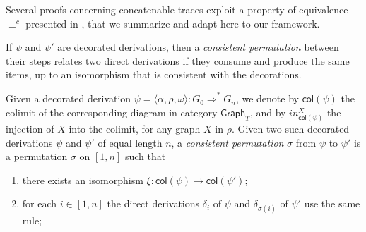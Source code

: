 \documentclass[conference]{IEEEtran}
\newcommand{\full}[1]{}
\newcommand{\full}[1]{{#1}}
\newcommand{\Rrel}[1]   {\stackrel{{#1}}{\Longrightarrow}}
\newcommand{\interval}[2][1]{\ensuremath{[{#1},{#2}]}}
\newcommand{\perm}{\sigma}
\newcommand{\tgraph}[1]{\ensuremath{\mathsf{Graph}_{#1}}}
\newcommand{\col}[1]{\ensuremath{\mathsf{col}({#1})}}
\begin{document}
{ %
 

Several proofs concerning concatenable traces exploit a 
property of equivalence $\equiv^c$ presented in \cite[Sec. 3.5]{Handbook}, 
that we summarize and adapt here to our framework. 


If $\psi$ and $\psi'$ are decorated derivations, then a \emph{consistent permutation}
between their steps relates two direct derivations if they consume
and produce the same items, up to an isomorphism that is consistent with the decorations.

%

%
%
%

\begin{definition}
\label{de:consistent_permutation}

Given a decorated derivation  $\psi = \langle \alpha, \rho, \omega \rangle:  G_0 \Rrel{}^* G_n$, 
we denote by $\col{\psi}$ the colimit of the corresponding diagram in category $\tgraph{T}$, and by $in^X_{\col{\psi}}$
the injection of $X$ into the colimit, for any graph $X$ in $\rho$.
Given two such decorated derivations $\psi$ and $\psi'$ of equal length $n$, 
a \emph{consistent permutation} $\perm$ from $\psi$ to $\psi'$ is a permutation
$\perm$ on $\interval{n}$ such that
\begin{enumerate}
\item there exists an isomorphism $\xi: \col{\psi} \to \col{\psi'}$;
\item for each $i \in \interval{n}$ the direct derivations $\delta_i$ of $\psi$ and $\delta_{\perm(i)}$ of $\psi'$
use the same rule;


\end{enumerate}
\end{definition}}
\end{document}

